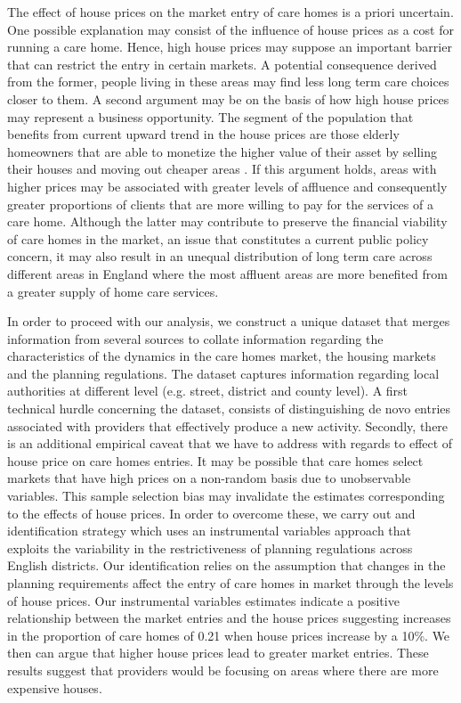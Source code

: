 \documentclass[12pt,letterpaper]{article}
\begin{document}
The effect of house prices on the market entry of care homes is a priori uncertain. 
One possible explanation may consist of the influence of house prices as a cost for running a care home. 
Hence, high house prices may suppose an important barrier that can restrict the entry in certain markets.
 A potential consequence derived from the former, people living in these areas may find less long term care
  choices closer to them. A second argument may be on the basis of how high house prices may represent
   a business opportunity. The segment of the population that benefits from current upward trend in the house
    prices are those elderly homeowners that are able to monetize the higher value of their asset by selling their
     houses and moving out cheaper areas \citep{hilber2016housing}. If this argument holds, areas with higher 
     prices may be associated with greater levels of affluence and consequently greater proportions of clients
      that are more willing to pay for the services of a care home. Although the latter may contribute to preserve 
      the financial viability of care homes in the market, an issue that constitutes a current public policy concern, 
      it may also result in an unequal distribution of long term care across different areas in England where the
       most affluent areas are more benefited from a greater supply of home care services. 

In order to proceed with our analysis, we construct a unique dataset that merges information from several 
sources to collate information regarding the characteristics of the dynamics in the care homes market, the
 housing markets and the planning regulations. The dataset captures information regarding local authorities 
 at different level (e.g. street, district and county level). A first technical hurdle concerning the dataset, consists
  of distinguishing de novo entries associated with providers that effectively produce a new activity. Secondly, 
  there is an additional empirical caveat that we have to address with regards to effect of house price on care
   homes entries. It may be possible that care homes select markets that have high prices on a non-random 
   basis due to unobservable variables. This sample selection bias may invalidate the estimates corresponding
    to the effects of house prices. In order to overcome these, we carry out and identification strategy which 
    uses an instrumental variables approach that exploits the variability in the restrictiveness of planning
     regulations across English districts. Our identification relies on the assumption that changes in the planning
      requirements affect the entry of care homes in market through the levels of house prices. Our instrumental
       variables estimates indicate a positive relationship between the market entries and the house prices
        suggesting increases in the proportion of care homes of 0.21 when house prices increase by a 10\%.  
        We then can argue that higher house prices lead to greater market entries. These results suggest that
         providers would be focusing on areas where there are more expensive houses. 
\end{document}
